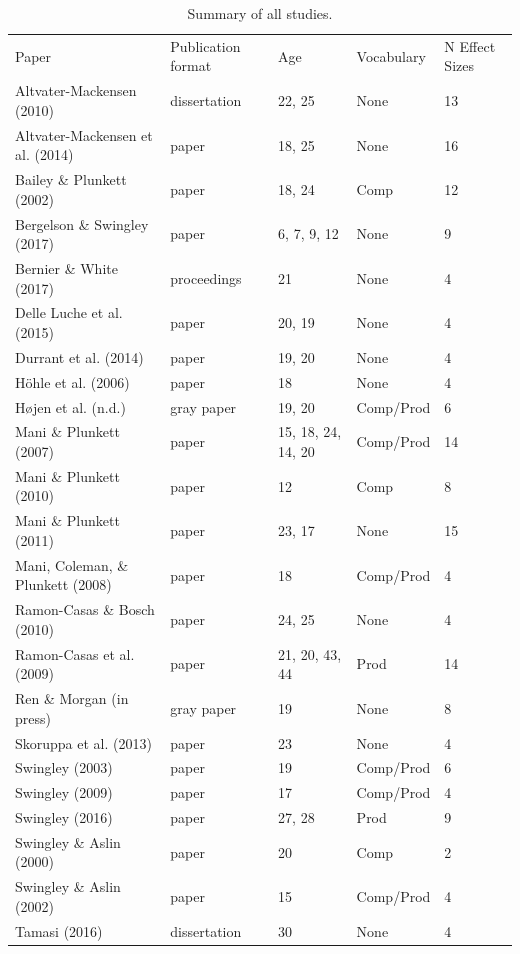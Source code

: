 \documentclass[man]{apa6}
\makeatletter
\newenvironment{lltable}{\begin{landscape}\begin{center}\begin{ThreePartTable}}{\end{ThreePartTable}\end{center}\end{landscape}}
\newcommand\LastLTentrywidth{1em}
\newlength\longtablewidth
\newcommand{\getlongtablewidth}{\begingroup \ifcsname LT@\roman{LT@tables}\endcsname \global\longtablewidth=0pt \renewcommand{\LT@entry}[2]{\global\advance\longtablewidth by ##2\relax\gdef\LastLTentrywidth{##2}}\@nameuse{LT@\roman{LT@tables}} \fi \endgroup}
\theoremstyle{definition}
\theoremstyle{definition}
\theoremstyle{definition}
\theoremstyle{remark}
\makeatother
\begin{document}
\begin{lltable}


\begin{longtable}{lllll}\noalign{\getlongtablewidth\global\LTcapwidth=\longtablewidth}
\caption{\label{tab:SummaryTable}Summary of all studies.}\\
\toprule
Paper & Publication format & Age & Vocabulary & N Effect Sizes\\
\midrule
Altvater-Mackensen (2010) & dissertation & 22, 25 & None & 13\\
Altvater-Mackensen et al. (2014) & paper & 18, 25 & None & 16\\
Bailey \& Plunkett (2002) & paper & 18, 24 & Comp & 12\\
Bergelson \& Swingley (2017) & paper & 6, 7, 9, 12 & None & 9\\
Bernier \& White (2017) & proceedings & 21 & None & 4\\
Delle Luche et al. (2015) & paper & 20, 19 & None & 4\\
Durrant et al. (2014) & paper & 19, 20 & None & 4\\
Höhle et al. (2006) & paper & 18 & None & 4\\
Højen et al. (n.d.) & gray paper & 19, 20 & Comp/Prod & 6\\
Mani \& Plunkett (2007) & paper & 15, 18, 24, 14, 20 & Comp/Prod & 14\\
Mani \& Plunkett (2010) & paper & 12 & Comp & 8\\
Mani \& Plunkett (2011) & paper & 23, 17 & None & 15\\
Mani, Coleman, \& Plunkett (2008) & paper & 18 & Comp/Prod & 4\\
Ramon-Casas \& Bosch (2010) & paper & 24, 25 & None & 4\\
Ramon-Casas et al. (2009) & paper & 21, 20, 43, 44 & Prod & 14\\
Ren \& Morgan (in press) & gray paper & 19 & None & 8\\
Skoruppa et al. (2013) & paper & 23 & None & 4\\
Swingley (2003) & paper & 19 & Comp/Prod & 6\\
Swingley (2009) & paper & 17 & Comp/Prod & 4\\
Swingley (2016) & paper & 27, 28 & Prod & 9\\
Swingley \& Aslin (2000) & paper & 20 & Comp & 2\\
Swingley \& Aslin (2002) & paper & 15 & Comp/Prod & 4\\
Tamasi (2016) & dissertation & 30 & None & 4\\

\end{longtable}
\end{lltable}
\end{document}
